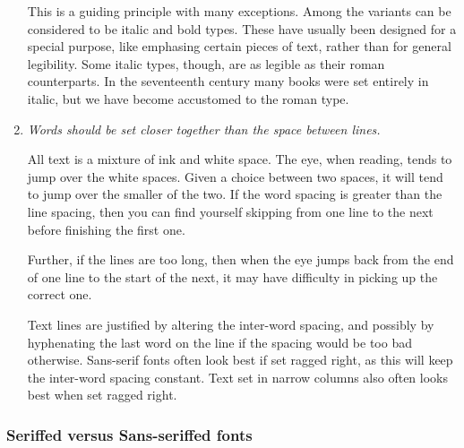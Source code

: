 \documentclass[10pt,a4paper,oneside,extrafontsizes]{memoir}%
\begin{document}
\begin{paracol}{2}
\begin{enumerate}
    This is a guiding principle with many exceptions. Among the variants
can be considered to be italic and bold types. These have usually been
designed for a special purpose, like emphasing 
certain pieces of text, rather
than for general legibility. Some italic types, though, are as legible as their
roman counterparts. In the seventeenth century many books were set entirely
in italic, but we have become accustomed to the roman type.

\item \emph{Words should be set closer together than the space between lines.}

    All text is a mixture of ink and white space. The eye, when reading, 
tends to jump over the white spaces. Given a choice between two spaces, it 
will tend to jump over the smaller of the two. If the word spacing is greater
than the line spacing, then you can find yourself skipping from one line
to the next before finishing the first one.

    Further, if the lines are too long, then when the eye jumps back from
the end of one line to the start of the next, it may have difficulty in 
picking up the correct one.

    Text lines are justified by altering the inter-word spacing, and possibly
by hyphenating the last word on the line if the spacing would be too bad
otherwise. Sans-serif fonts often look best if set ragged right, as this will
keep the inter-word spacing constant. Text set in narrow 
columns also often
looks best when set ragged right.

\end{enumerate}
\end{paracol}


\subsubsection{Seriffed versus Sans-seriffed fonts}
\end{document}
